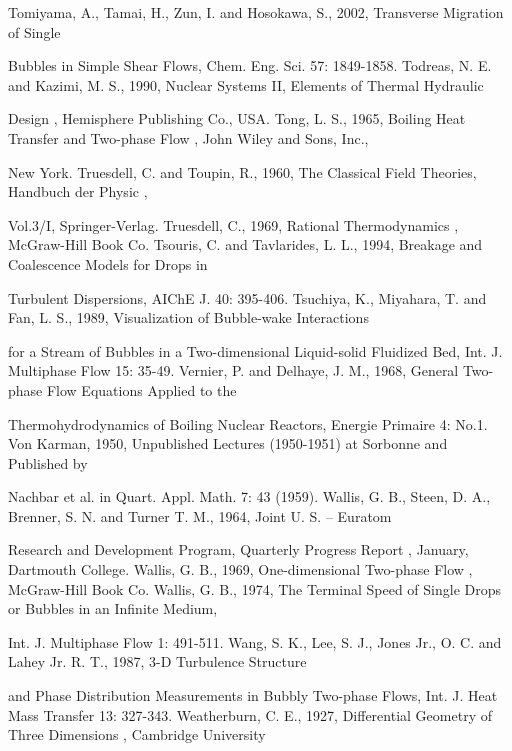 \documentclass[11pt,a4paper,openany,fontset=none]{ctexbook}
\begin{document}
{\small\raggedright\noindent Tomiyama, A., Tamai, H., Zun, I. and Hosokawa, S., 2002, Transverse Migration of Single\par}
{\small\raggedright\noindent Bubbles in Simple Shear Flows, Chem. Eng. Sci. 57: 1849-1858. Todreas, N. E. and Kazimi, M. S., 1990, Nuclear Systems II, Elements of Thermal Hydraulic\par}
{\small\raggedright\noindent Design , Hemisphere Publishing Co., USA. Tong, L. S., 1965, Boiling Heat Transfer and Two-phase Flow , John Wiley and Sons, Inc.,\par}
{\small\raggedright\noindent New York. Truesdell, C. and Toupin, R., 1960, The Classical Field Theories, Handbuch der Physic ,\par}
{\small\raggedright\noindent Vol.3/I, Springer-Verlag. Truesdell, C., 1969, Rational Thermodynamics , McGraw-Hill Book Co. Tsouris, C. and Tavlarides, L. L., 1994, Breakage and Coalescence Models for Drops in\par}
{\small\raggedright\noindent Turbulent Dispersions, AIChE J. 40: 395-406. Tsuchiya, K., Miyahara, T. and Fan, L. S., 1989, Visualization of Bubble-wake Interactions\par}
{\small\raggedright\noindent for a Stream of Bubbles in a Two-dimensional Liquid-solid Fluidized Bed, Int. J. Multiphase Flow 15: 35-49. Vernier, P. and Delhaye, J. M., 1968, General Two-phase Flow Equations Applied to the\par}
{\small\raggedright\noindent Thermohydrodynamics of Boiling Nuclear Reactors, Energie Primaire 4: No.1. Von Karman, 1950, Unpublished Lectures (1950-1951) at Sorbonne and Published by\par}
{\small\raggedright\noindent Nachbar et al. in Quart. Appl. Math. 7: 43 (1959). Wallis, G. B., Steen, D. A., Brenner, S. N. and Turner T. M., 1964, Joint U. S. – Euratom\par}
{\small\raggedright\noindent Research and Development Program, Quarterly Progress Report , January, Dartmouth College. Wallis, G. B., 1969, One-dimensional Two-phase Flow , McGraw-Hill Book Co. Wallis, G. B., 1974, The Terminal Speed of Single Drops or Bubbles in an Infinite Medium,\par}
{\small\raggedright\noindent Int. J. Multiphase Flow 1: 491-511. Wang, S. K., Lee, S. J., Jones Jr., O. C. and Lahey Jr. R. T., 1987, 3-D Turbulence Structure\par}
{\small\raggedright\noindent and Phase Distribution Measurements in Bubbly Two-phase Flows, Int. J. Heat Mass Transfer 13: 327-343. Weatherburn, C. E., 1927, Differential Geometry of Three Dimensions , Cambridge University\par}
\end{document}
